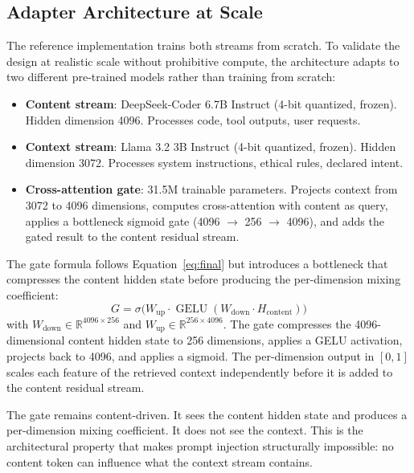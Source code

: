 \documentclass[11pt,a4paper]{article}
\theoremstyle{definition}
\DeclareMathOperator{\GELU}{GELU}
\begin{document}
\subsection{Adapter Architecture at Scale}\label{sec:adapter}

The reference implementation trains both streams from scratch. To validate the design at realistic scale without prohibitive compute, the architecture adapts to two different pre-trained models rather than training from scratch:

\begin{itemize}
  \item \textbf{Content stream}: DeepSeek-Coder 6.7B Instruct (4-bit quantized, frozen). Hidden dimension 4096. Processes code, tool outputs, user requests.
  \item \textbf{Context stream}: Llama 3.2 3B Instruct (4-bit quantized, frozen). Hidden dimension 3072. Processes system instructions, ethical rules, declared intent.
  \item \textbf{Cross-attention gate}: 31.5M trainable parameters. Projects context from 3072 to 4096 dimensions, computes cross-attention with content as query, applies a bottleneck sigmoid gate (4096 $\to$ 256 $\to$ 4096), and adds the gated result to the content residual stream.
\end{itemize}

The gate formula follows Equation~\eqref{eq:final} but introduces a bottleneck that compresses the content hidden state before producing the per-dimension mixing coefficient:
\begin{equation}\label{eq:bottleneck_gate}
  G = \sigma\!\big(W_{\text{up}} \cdot \GELU(W_{\text{down}} \cdot H_{\text{content}})\big)
\end{equation}
with $W_{\text{down}} \in \mathbb{R}^{4096 \times 256}$ and $W_{\text{up}} \in \mathbb{R}^{256 \times 4096}$. The gate compresses the 4096-dimensional content hidden state to 256 dimensions, applies a GELU activation, projects back to 4096, and applies a sigmoid. The per-dimension output in $[0, 1]$ scales each feature of the retrieved context independently before it is added to the content residual stream.

The gate remains content-driven. It sees the content hidden state and produces a per-dimension mixing coefficient. It does not see the context. This is the architectural property that makes prompt injection structurally impossible: no content token can influence what the context stream contains.
\end{document}
